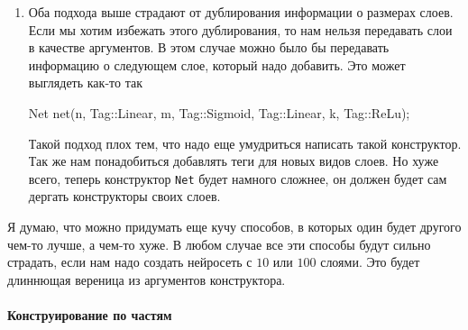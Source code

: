 \begin{enumerate}
\item Оба подхода выше страдают от дублирования информации о размерах слоев.
Если мы хотим избежать этого дублирования, то нам нельзя передавать слои в качестве аргументов.
В этом случае можно было бы передавать информацию о следующем слое, который надо добавить.
Это может выглядеть как-то так
\begin{cppcode}
Net net(n, Tag::Linear, m, Tag::Sigmoid, Tag::Linear, k, Tag::ReLu);
\end{cppcode}
Такой подход плох тем, что надо еще умудриться написать такой конструктор.
Так же нам понадобиться добавлять теги для новых видов слоев.
Но хуже всего, теперь конструктор \verb"Net" будет намного сложнее, он должен будет сам дергать конструкторы своих слоев.
\end{enumerate}
Я думаю, что можно придумать еще кучу способов, в которых один будет другого чем-то лучше, а чем-то хуже.
В любом случае все эти способы будут сильно страдать, если нам надо создать нейросеть с $10$ или $100$ слоями.
Это будет длиннющая вереница из аргументов конструктора.

\paragraph{Конструирование по частям}


